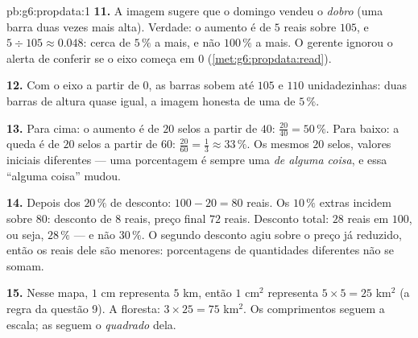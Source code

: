 \begin{solution}{pb:g6:propdata:1}
\textbf{11.} A imagem sugere que o domingo vendeu o \emph{dobro} (uma
barra duas vezes mais alta). Verdade: o aumento é de $5$ reais sobre
$105$, e $5 \div 105 \approx 0.048$: cerca de $5\,\%$ a mais, e não
$100\,\%$ a mais. O gerente ignorou o alerta de conferir se o eixo
começa em $0$ (\cref{met:g6:propdata:read}).

\textbf{12.} Com o eixo a partir de $0$, as barras sobem até $105$ e
$110$ unidadezinhas: duas barras de altura quase igual, a imagem
honesta de uma  de $5\,\%$.

\textbf{13.} Para cima: o aumento é de $20$ selos a partir de $40$:
$\frac{20}{40} = 50\,\%$. Para baixo: a queda é de $20$ selos a partir
de $60$: $\frac{20}{60} = \frac13 \approx 33\,\%$. Os mesmos $20$
selos, valores iniciais diferentes --- uma porcentagem é sempre uma
 \emph{de alguma coisa}, e essa ``alguma coisa'' mudou.

\textbf{14.} Depois dos $20\,\%$ de desconto: $100 - 20 = 80$ reais. Os
$10\,\%$ extras incidem sobre $80$: desconto de $8$ reais, preço final
$72$ reais. Desconto total: $28$ reais em $100$, ou seja, $28\,\%$ ---
e não $30\,\%$. O segundo desconto agiu sobre o preço já reduzido,
então os reais dele são menores: porcentagens de quantidades diferentes
não se somam.

\textbf{15.} Nesse mapa, $1$ cm representa $5$ km, então $1$ cm$^2$
representa $5 \times 5 = 25$ km$^2$ (a regra da questão 9). A floresta:
$3 \times 25 = 75$ km$^2$. Os comprimentos seguem a escala; as 
seguem o \emph{quadrado} dela.
\end{solution}
